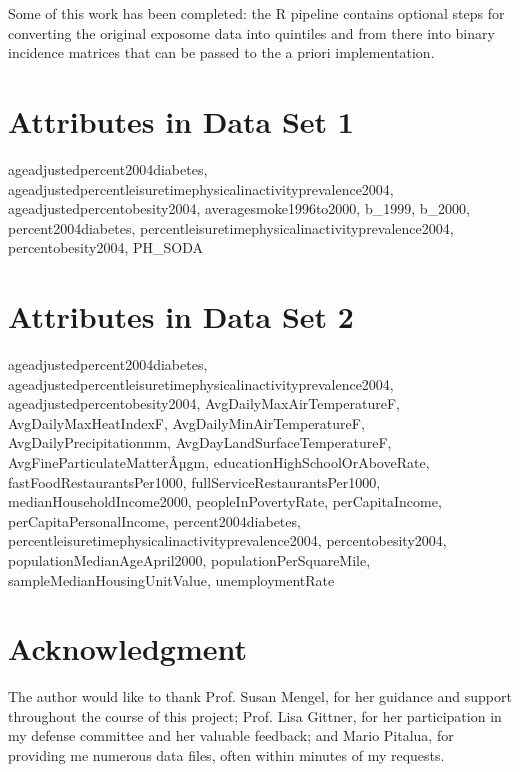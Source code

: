 \documentclass[conference,compsoc]{IEEEtran}
\begin{document}
Some of this work has been completed: the R pipeline contains optional steps for converting the original exposome data into quintiles and from there
into binary incidence matrices that can be passed to the a priori implementation.

\begin{appendices}

\section{Attributes in Data Set 1}
\label{appendix:dataset1}

ageadjustedpercent2004diabetes, 
ageadjustedpercentleisuretimephysicalinactivityprevalence2004, 
ageadjustedpercentobesity2004, 
averagesmoke1996to2000,
b\_1999,
b\_2000,
percent2004diabetes,
percentleisuretimephysicalinactivityprevalence2004,
percentobesity2004, 
PH\_SODA

\section{Attributes in Data Set 2}
\label{appendix:dataset2}

ageadjustedpercent2004diabetes,
ageadjustedpercentleisuretimephysicalinactivityprevalence2004, 
ageadjustedpercentobesity2004, 
AvgDailyMaxAirTemperatureF, 
AvgDailyMaxHeatIndexF, 
AvgDailyMinAirTemperatureF, 
AvgDailyPrecipitationmm, 
AvgDayLandSurfaceTemperatureF, 
AvgFineParticulateMatterÂµgm, 
educationHighSchoolOrAboveRate, 
fastFoodRestaurantsPer1000,
fullServiceRestaurantsPer1000,
medianHouseholdIncome2000, 
peopleInPovertyRate, 
perCapitaIncome, 
perCapitaPersonalIncome, 
percent2004diabetes, 
percentleisuretimephysicalinactivityprevalence2004, 
percentobesity2004, 
populationMedianAgeApril2000, 
populationPerSquareMile, 
sampleMedianHousingUnitValue, 
unemploymentRate

\end{appendices}

\section*{Acknowledgment}

The author would like to thank Prof. Susan Mengel, for her guidance and support throughout the course of this project; Prof. Lisa Gittner, for her participation in my defense committee and her valuable feedback; and Mario Pitalua, for providing me numerous data files, often within minutes of my requests.
\end{document}
